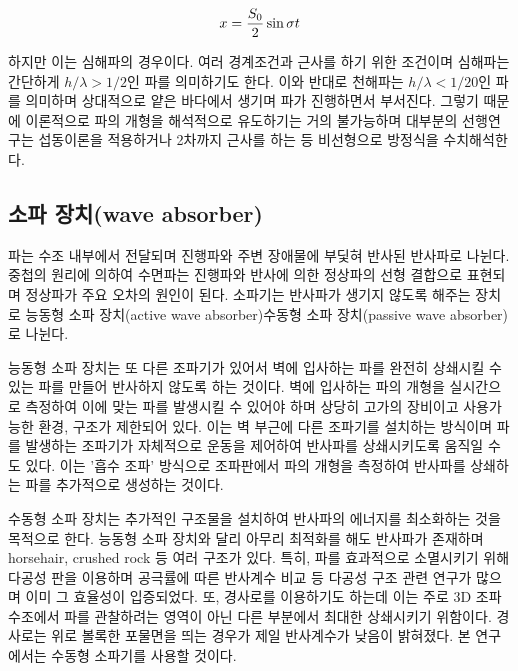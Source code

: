\begin{equation} \label{eq:7}
{
    x = {{S_0}\over2} \sin{\sigma t}
}
\end{equation}

하지만 이는 심해파의 경우이다. 여러 경계조건과 근사를 하기 위한 조건이며 심해파는 간단하게 $h/\lambda > 1/2$인 파를 의미하기도 한다. 이와 반대로 천해파는 $h/\lambda < 1/20$인 파를 의미하며 상대적으로 얕은 바다에서 생기며 파가 진행하면서 부서진다. 그렇기 때문에 이론적으로 파의 개형을 해석적으로 유도하기는 거의 불가능하며 대부분의 선행연구는 섭동이론을 적용하거나 2차까지 근사를 하는 등 비선형으로 방정식을 수치해석한다\cite{society1993laboratory}. 

\subsection{소파 장치(wave absorber)}
파는 수조 내부에서 전달되며 진행파와 주변 장애물에 부딫혀 반사된 반사파로 나뉜다. 중첩의 원리에 의하여 수면파는 진행파와 반사에 의한 정상파의 선형 결합으로 표현되며 정상파가 주요 오차의 원인이 된다. 소파기는 반사파가 생기지 않도록 해주는 장치로 능동형 소파 장치(active wave absorber)\와 수동형 소파 장치(passive wave absorber)로 나뉜다\cite{ouellet1986survey}.


능동형 소파 장치는 또 다른 조파기가 있어서 벽에 입사하는 파를 완전히 상쇄시킬 수 있는 파를 만들어 반사하지 않도록 하는 것이다. 벽에 입사하는 파의 개형을 실시간으로 측정하여 이에 맞는 파를 발생시킬 수 있어야 하며 상당히 고가의 장비이고 사용가능한 환경, 구조가 제한되어 있다. 이는 벽 부근에 다른 조파기를 설치하는 방식이며 파를 발생하는 조파기가 자체적으로 운동을 제어하여 반사파를 상쇄시키도록 움직일 수도 있다. 이는 '흡수 조파' 방식으로 조파판에서 파의 개형을 측정하여 반사파를 상쇄하는 파를 추가적으로 생성하는 것이다.


수동형 소파 장치는 추가적인 구조물을 설치하여 반사파의 에너지를 최소화하는 것을 목적으로 한다. 능동형 소파 장치와 달리 아무리 최적화를 해도 반사파가 존재하며 horsehair, crushed rock 등 여러 구조가 있다. 특히, 파를 효과적으로 소멸시키기 위해 다공성 판을 이용하며 공극률에 따른 반사계수 비교 등 다공성 구조 관련 연구가 많으며 이미 그 효율성이 입증되었다\cite{lim2014optimum, o2017methods}. 또, 경사로를 이용하기도 하는데 이는 주로 3D 조파 수조에서 파를 관찰하려는 영역이 아닌 다른 부분에서 최대한 상쇄시키기 위함이다. 경사로는 위로 볼록한 포물면을 띄는 경우가 제일 반사계수가 낮음이 밝혀졌다. 본 연구에서는 수동형 소파기를 사용할 것이다.

